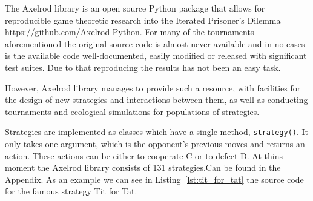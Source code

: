 The Axelrod library \cite{axelrodproject} is an open source Python package that allows for
reproducible game theoretic research into the Iterated Prisoner's Dilemma
\url{https://github.com/Axelrod-Python}.
For many of the tournaments aforementioned the original source code is almost never
available and in no cases is the available code well-documented, easily modified
or released with significant test suites. Due to that reproducing the results
has not been an easy task.

However, Axelrod library manages to provide such a resource, with facilities for
the design of new strategies and interactions between them, as well as
conducting tournaments and ecological simulations for populations of strategies.

Strategies are implemented as classes which have a single method, \texttt{strategy()}.
It only takes one argument, which is the opponent's previous moves and returns
an action. These actions can be either to cooperate C or to defect D. At thins
moment the Axelrod library consists of 131 strategies.Can be found in the Appendix.
As an example we can see in Listing~\ref{lst:tit_for_tat} the source code for the
famous strategy Tit for Tat.


